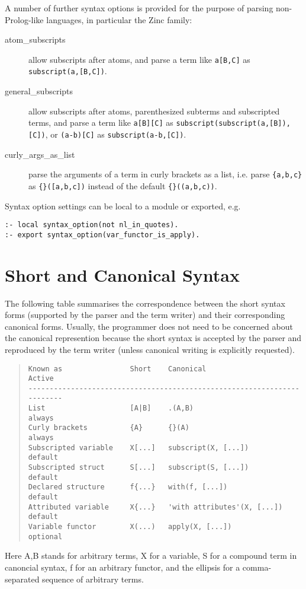 A number of further syntax options is provided for the purpose of parsing
non-Prolog-like languages, in particular the Zinc family:
\begin{description}
\item[atom_subscripts] allow subscripts after atoms, and parse a term
    like \verb.a[B,C]. as \verb.subscript(a,[B,C])..
\item[general_subscripts] allow subscripts after atoms, parenthesized
    subterms and subscripted terms, and parse a term
    like \verb.a[B][C]. as \verb.subscript(subscript(a,[B]),[C]).,
    or \verb.(a-b)[C]. as \verb.subscript(a-b,[C])..
\item[curly_args_as_list] parse the arguments of a term in curly
    brackets as a list, i.e. parse \verb.{a,b,c}.
    as \verb.{}([a,b,c]). instead of the default \verb.{}((a,b,c))..
\end{description}
Syntax option  settings can be local to a module or exported, e.g.
\begin{verbatim}
:- local syntax_option(not nl_in_quotes).
:- export syntax_option(var_functor_is_apply).
\end{verbatim}

\section{Short and Canonical Syntax}

The following table summarises the correspondence between the short syntax
forms (supported by the parser and the term writer) and their corresponding
canonical forms. Usually, the programmer does not need to be concerned about
the canonical represention because the short syntax is accepted by the parser
and reproduced by the term writer (unless canonical writing is explicitly
requested).
\begin{quote}\begin{verbatim}
Known as                Short    Canonical                    Active
------------------------------------------------------------------------
List                    [A|B]    .(A,B)                       always
Curly brackets          {A}      {}(A)                        always
Subscripted variable    X[...]   subscript(X, [...])          default
Subscripted struct      S[...]   subscript(S, [...])          default
Declared structure      f{...}   with(f, [...])               default
Attributed variable     X{...}   'with attributes'(X, [...])  default
Variable functor        X(...)   apply(X, [...])              optional
\end{verbatim}\end{quote}
Here A,B stands for arbitrary terms, X for a variable, S for a compound term
in canoncial syntax, f for an arbitrary functor, and the ellipsis for
a comma-separated sequence of arbitrary terms.

